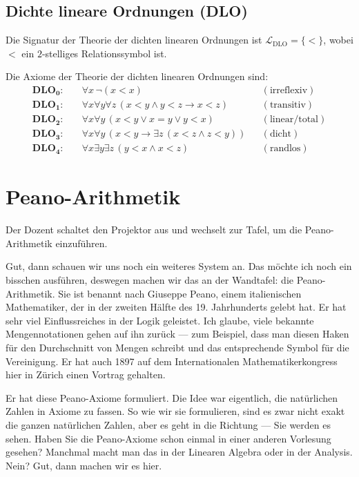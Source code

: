 \subsection{Dichte lineare Ordnungen (DLO)}
\begin{math-stroke}
Die Signatur der Theorie der dichten linearen Ordnungen ist $\mathcal{L}_{\text{DLO}} = \{ < \}$, wobei $<$ ein $2$-stelliges Relationssymbol ist.

Die Axiome der Theorie der dichten linearen Ordnungen sind:
\begin{align}
    \mathbf{DLO_0}\colon &\quad \forall x \, \neg(x < x) && (\text{irreflexiv}) \nonumber \\
    \mathbf{DLO_1}\colon &\quad \forall x \forall y \forall z \, (x < y \land y < z \to x < z) && (\text{transitiv}) \nonumber \\
    \mathbf{DLO_2}\colon &\quad \forall x \forall y \, (x < y \lor x = y \lor y < x) && (\text{linear/total}) \nonumber \\
    \mathbf{DLO_3}\colon &\quad \forall x \forall y \, (x < y \to \exists z \, (x < z \land z < y)) && (\text{dicht}) \nonumber \\
    \mathbf{DLO_4}\colon &\quad \forall x \exists y \exists z \, (y < x \land x < z) && (\text{randlos}) \nonumber
\end{align}
\end{math-stroke}

\section{Peano-Arithmetik}

\begin{meta-note}[Tafelübergang]
Der Dozent schaltet den Projektor aus und wechselt zur Tafel, um die Peano-Arithmetik einzuführen.
\end{meta-note}

\begin{spoken-clean}[00:04:20 - 00:06:29]
Gut, dann schauen wir uns noch ein weiteres System an. Das möchte ich noch ein bisschen ausführen, deswegen machen wir das an der Wandtafel: die Peano-Arithmetik. Sie ist benannt nach Giuseppe Peano, einem italienischen Mathematiker, der in der zweiten Hälfte des 19. Jahrhunderts gelebt hat. Er hat sehr viel Einflussreiches in der Logik geleistet. Ich glaube, viele bekannte Mengennotationen gehen auf ihn zurück --- zum Beispiel, dass man diesen Haken für den Durchschnitt von Mengen schreibt und das entsprechende Symbol für die Vereinigung. Er hat auch 1897 auf dem Internationalen Mathematikerkongress hier in Zürich einen Vortrag gehalten.

Er hat diese Peano-Axiome formuliert. Die Idee war eigentlich, die natürlichen Zahlen in Axiome zu fassen. So wie wir sie formulieren, sind es zwar nicht exakt die ganzen natürlichen Zahlen, aber es geht in die Richtung --- Sie werden es sehen. Haben Sie die Peano-Axiome schon einmal in einer anderen Vorlesung gesehen? Manchmal macht man das in der Linearen Algebra oder in der Analysis. Nein? Gut, dann machen wir es hier.
\end{spoken-clean}

